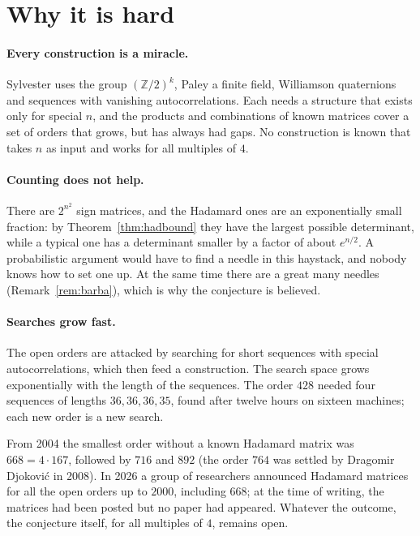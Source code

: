 \section{Why it is hard}

\paragraph{Every construction is a miracle.} Sylvester uses the group $(\mathbb Z/2)^k$, Paley a finite field, Williamson quaternions and sequences with
vanishing autocorrelations. Each needs a structure that exists only for special $n$, and the products and combinations of known matrices cover a set
of orders that grows, but has always had gaps. No construction is known that takes $n$ as input and works for all multiples of $4$.

\paragraph{Counting does not help.} There are $2^{n^2}$ sign matrices, and the Hadamard ones are an exponentially small fraction: by
Theorem~\ref{thm:hadbound} they have the largest possible determinant, while a typical one has a determinant smaller by a factor of about $e^{n/2}$.
A probabilistic argument would have to find a needle in this haystack, and nobody knows how to set one up. At the same time there are a great many
needles (Remark~\ref{rem:barba}), which is why the conjecture is believed.

\paragraph{Searches grow fast.} The open orders are attacked by searching for short sequences with special autocorrelations, which then feed a
construction. The search space grows exponentially with the length of the sequences. The order $428$ needed four sequences of lengths $36,36,36,35$,
found after twelve hours on sixteen machines; each new order is a new search.

\begin{remark}\label{rem:668}
From 2004 the smallest order without a known Hadamard matrix was $668=4\cdot167$, followed by $716$ and $892$ (the order $764$ was settled by Dragomir
Djokovi\'c in 2008). In 2026 a group of researchers announced Hadamard matrices for all the open orders up to $2000$, including $668$; at the time of
writing, the matrices had been posted but no paper had appeared. Whatever the outcome, the conjecture itself, for all multiples of $4$, remains open.
\end{remark}

